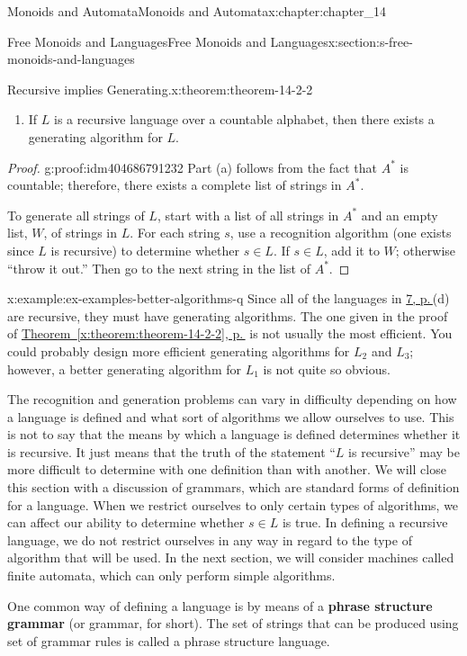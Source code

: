 \documentclass[twoside,10pt,]{book}
\newcommand{\xreffont}{\relax}
\newcommand{\terminology}[1]{\textbf{#1}}
\numberwithin{equation}{section}
\begin{document}
\begin{chapterptx}{Monoids and Automata}{}{Monoids and Automata}{}{}{x:chapter:chapter_14}
\begin{sectionptx}{Free Monoids and Languages}{}{Free Monoids and Languages}{}{}{x:section:s-free-monoids-and-languages}
\begin{theorem}{Recursive implies Generating.}{}{x:theorem:theorem-14-2-2}
\begin{enumerate}[label=(\alph*)]
\item{}If \(L\) is a recursive language over a countable alphabet, then there exists a generating algorithm for \(L\).%
\end{enumerate}
%
\end{theorem}
\begin{proof}{}{g:proof:idm404686791232}
Part (a) follows from the fact that \(A^*\) is countable; therefore, there exists a complete list of strings in \(A^*\).%
\par
To generate all strings of \(L\), start with a list of all strings in \(A^*\) and an empty list, \(W\), of strings in \(L\). For each string \(s\), use a recognition algorithm (one exists since \(L\) is recursive) to determine whether \(s\in L\). If \(s \in L\), add it to \(W\); otherwise ``throw it out.'' Then go to the next string in the list of \(A^*\).%
\end{proof}
\begin{example}{}{x:example:ex-examples-better-algorithms-q}%
Since all of the languages in \hyperref[x:example:ex-some-formal-languages]{7, p.\,\pageref{x:example:ex-some-formal-languages}}(d) are recursive, they must have generating algorithms. The one given in the proof of \hyperref[x:theorem:theorem-14-2-2]{Theorem~{\xreffont\ref{x:theorem:theorem-14-2-2}}, p.\,\pageref{x:theorem:theorem-14-2-2}} is not usually the most efficient. You could probably design more efficient generating algorithms for \(L_2\) and \(L_3\); however, a better generating algorithm for \(L_1\) is not quite so obvious.%
\end{example}
The recognition and generation problems can vary in difficulty depending on how a language is defined and what sort of algorithms we allow ourselves to use. This is not to say that the means by which a language is defined determines whether it is recursive. It just means that the truth of the statement ``\(L\) is recursive'' may be more difficult to determine with one definition than with another. We will close this section with a discussion of grammars, which are standard forms of definition for a language. When we restrict ourselves to only certain types of algorithms, we can affect our ability to determine whether \(s\in L\) is true. In defining a recursive language, we do not restrict ourselves in any way in regard to the type of algorithm that will be used. In the next section, we will consider machines called finite automata, which can only perform simple algorithms.%
\par
One common way of defining a language is by means of a \terminology{phrase structure grammar}  (or grammar, for short). The set of strings that can be produced using set of grammar rules is called a phrase structure language.%

\end{sectionptx}
\end{chapterptx}
\end{document}
